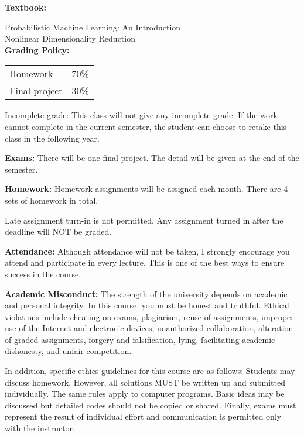 \documentclass[a4paper,10pt]{article}
\begin{document}
\textbf{Textbook:} 

Probabilistic Machine Learning: An Introduction \\
Nonlinear Dimensionality Reduction \\




\textbf{Grading Policy:}

\begin{tabular}{lr}
Homework & 70\%\\ 
Final project & 30\% \\
\end{tabular}

Incomplete grade: This class will not give any
incomplete grade. If the work cannot complete in the
current semester, the student can choose to retake this
class in the following year.




\textbf{Exams:} There will be one final project. The detail will be given at the end of the semester. 


\textbf{Homework:} Homework assignments will be assigned each month. There are 4 sets of homework in total. 

Late assignment turn-in is not permitted. Any assignment turned in after the deadline will NOT be graded.




\textbf{Attendance:} Although attendance will not be taken, I strongly encourage you attend and participate in every lecture. This is one of the best ways to ensure success in the course.






\textbf{Academic Misconduct:} The strength of the university depends on academic and personal integrity. In this course, you must be honest 
and truthful. Ethical violations include cheating on exams, plagiarism, reuse of assignments, improper use 
of the Internet and electronic devices, unauthorized collaboration, alteration of graded assignments, forgery 
and falsification, lying, facilitating academic dishonesty, and unfair competition.

In addition, specific ethics guidelines for this course are as follows: Students may discuss homework. However, 
all solutions MUST be written up and submitted individually. The same rules apply to computer programs. 
Basic ideas may be discussed but detailed codes should not be copied or shared. Finally, exams must 
represent the result of individual effort and communication is permitted only with the instructor.
\end{document}

